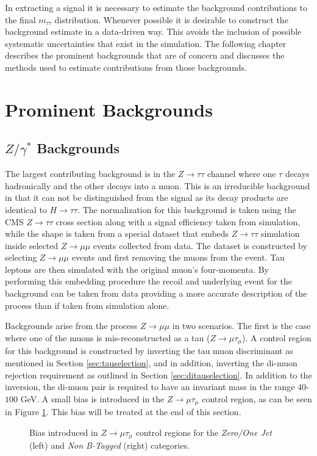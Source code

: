 In extracting a signal it is necessary to estimate the background contributions to the final $m_{\tau\tau}$ distribution.
Whenever possible it is desirable to construct the background estimate in a data-driven way. 
This avoids the inclusion of possible systematic uncertainties that exist in the simulation.
The following chapter describes the prominent backgrounds that are of concern and discusses the methods used to estimate contributions from those backgrounds.
\section{Prominent Backgrounds}
\label{sec:backgrounds}

\subsection{\texorpdfstring{$Z/\gamma^{*}$}{Drell-Yan} Backgrounds}
The largest contributing background is in the $Z\rightarrow\tau\tau$ channel where one $\tau$ decays hadronically and the other decays into a muon.
This is an irreducible background in that it can not be distinguished from the signal as its decay products are identical to $H\rightarrow\tau\tau$.
The normalization for this background is taken using the CMS $Z\rightarrow\tau\tau$ cross section along with a signal efficiency taken from simulation, while the shape is taken from a special dataset that embeds $Z\rightarrow\tau\tau$ simulation inside selected $Z\rightarrow\mu\mu$ events collected from data.
The dataset is constructed by selecting $Z\rightarrow\mu\mu$ events and first removing the muons from the event.
Tau leptons are then simulated with the original muon's four-momenta.
By performing this embedding procedure the recoil and underlying event for the background can be taken from data providing a more accurate description of the process than if taken from simulation alone.

Backgrounds arise from the process $Z\rightarrow\mu\mu$ in two scenarios.
The first is the case where one of the muons is mis-reconstructed as a tau ($Z\rightarrow\mu\tau_{\mu}$).
A control region for this background is constructed by inverting the tau muon discriminant as mentioned in Section \ref{sec:tauselection}, and in addition, inverting the di-muon rejection requirement as outlined in Section \ref{sec:ditauselection}.
In addition to the inversion, the di-muon pair is required to have an invariant mass in the range $40$-$100$ GeV.
A small bias is introduced in the $Z\rightarrow\mu\tau_{\mu}$ control region, as can be seen in Figure \ref{fig:zmumubias}. 
This bias will be treated at the end of this section.
\begin{figure}[ht]
\centering
{}
\caption{Bias introduced in $Z\rightarrow\mu\tau_{\mu}$ control regions for the \emph{Zero/One Jet} (left) and \emph{Non B-Tagged} (right) categories.}
\label{fig:zmumubias}
\end{figure}

